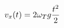 \documentclass[preview]{standalone}
\begin{document}
\begin{align*}
\special{dvisvgm:raw <g id='unique000'>}v_x(t)=2\omega_Tg\frac{t^2}{2}\special{dvisvgm:raw </g>}
\end{align*}
\end{document}
